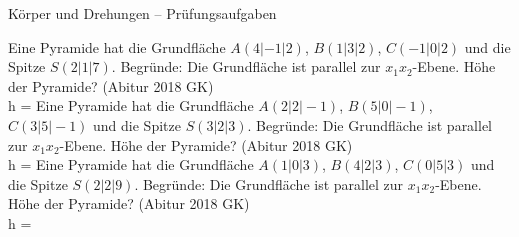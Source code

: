 \begin{aufgabe}{Körper und Drehungen – Prüfungsaufgaben}
\begin{teile}
\teil Eine Pyramide hat die Grundfläche $A(4 | -1 | 2)$, $B(1 | 3 | 2)$, $C(-1 | 0 | 2)$ und die Spitze $S(2 | 1 | 7)$. Begründe: Die Grundfläche ist parallel zur $x_1x_2$-Ebene. Höhe der Pyramide? \hfill (Abitur 2018 GK) \\ h = \leerfeld
\teil Eine Pyramide hat die Grundfläche $A(2 | 2 | -1)$, $B(5 | 0 | -1)$, $C(3 | 5 | -1)$ und die Spitze $S(3 | 2 | 3)$. Begründe: Die Grundfläche ist parallel zur $x_1x_2$-Ebene. Höhe der Pyramide? \hfill (Abitur 2018 GK) \\ h = \leerfeld
\teil Eine Pyramide hat die Grundfläche $A(1 | 0 | 3)$, $B(4 | 2 | 3)$, $C(0 | 5 | 3)$ und die Spitze $S(2 | 2 | 9)$. Begründe: Die Grundfläche ist parallel zur $x_1x_2$-Ebene. Höhe der Pyramide? \hfill (Abitur 2018 GK) \\ h = \leerfeld
\end{teile}
\end{aufgabe}

